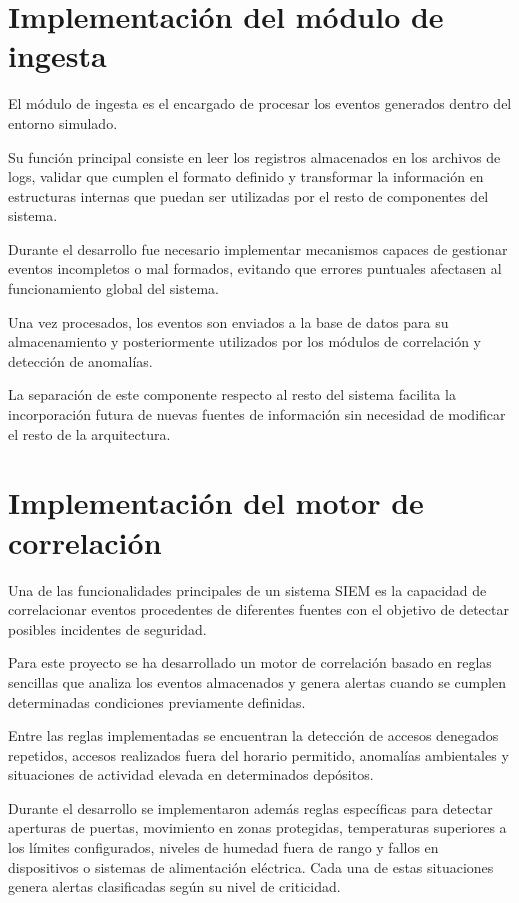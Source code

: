 \section{Implementación del módulo de ingesta}

El módulo de ingesta es el encargado de procesar los eventos generados dentro del entorno simulado.

Su función principal consiste en leer los registros almacenados en los archivos de logs, validar que cumplen el formato definido y transformar la información en estructuras internas que puedan ser utilizadas por el resto de componentes del sistema.

Durante el desarrollo fue necesario implementar mecanismos capaces de gestionar eventos incompletos o mal formados, evitando que errores puntuales afectasen al funcionamiento global del sistema.

Una vez procesados, los eventos son enviados a la base de datos para su almacenamiento y posteriormente utilizados por los módulos de correlación y detección de anomalías.

La separación de este componente respecto al resto del sistema facilita la incorporación futura de nuevas fuentes de información sin necesidad de modificar el resto de la arquitectura.

\section{Implementación del motor de correlación}

Una de las funcionalidades principales de un sistema SIEM es la capacidad de correlacionar eventos procedentes de diferentes fuentes con el objetivo de detectar posibles incidentes de seguridad.

Para este proyecto se ha desarrollado un motor de correlación basado en reglas sencillas que analiza los eventos almacenados y genera alertas cuando se cumplen determinadas condiciones previamente definidas.

Entre las reglas implementadas se encuentran la detección de accesos denegados repetidos, accesos realizados fuera del horario permitido, anomalías ambientales y situaciones de actividad elevada en determinados depósitos.

Durante el desarrollo se implementaron además reglas específicas para detectar aperturas de puertas, movimiento en zonas protegidas, temperaturas superiores a los límites configurados, niveles de humedad fuera de rango y fallos en dispositivos o sistemas de alimentación eléctrica. Cada una de estas situaciones genera alertas clasificadas según su nivel de criticidad.

